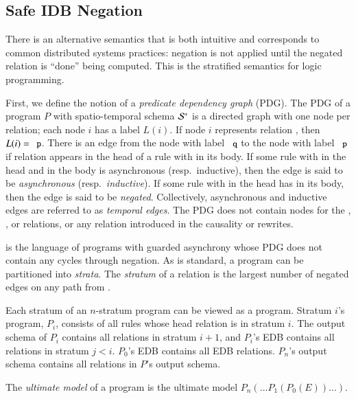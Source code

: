 \subsection{Safe IDB Negation}
\label{sec:perfect-construction}

There is an alternative semantics that is both intuitive and corresponds to common
distributed systems practices: negation is not applied until the negated
relation is ``done'' being computed.  This is the stratified semantics for logic programming.

First, we define the notion of a {\em predicate dependency graph} (PDG).  The PDG of a \lang program $P$ with spatio-temporal schema $\stschema$ is a directed graph with one node per relation; each node $i$ has a label $L(i)$.  If node $i$ represents relation , then $L(i) = \dedalus{p}$.  There is an edge from the node with label $\dedalus{q}$ to the node with label $\dedalus{p}$ if relation  appears in the head of a rule with  in its body.  If some rule with  in the head and  in the body is asynchronous (resp.\ inductive), then the edge is said to be {\em asynchronous} (resp.\ {\em inductive}).  If some rule with  in the head has  in its body, then the edge is said to be {\em negated}.  Collectively, asynchronous and inductive edges are referred to as {\em temporal edges}.  The PDG does not contain nodes for the , , or  relations, or any relation introduced in the causality or  rewrites.

\plang is the language of \lang programs with guarded asynchrony whose PDG does not contain any cycles through negation.  As is standard, a \plang program can be partitioned into {\em strata}.  The {\em stratum} of a relation  is the largest number of negated edges on any path from .

Each stratum of an $n$-stratum \plang program can be viewed as a \slang program.  Stratum $i$'s program, $P_i$, consists of all rules whose head relation is in stratum $i$.  The output schema of $P_i$ contains all relations in stratum $i+1$, and $P_i$'s EDB contains all relations in stratum $j < i$.  $P_0$'s EDB contains all EDB relations.  $P_n$'s output schema contains all relations in $P$'s output schema.

The {\em ultimate model} of a \slang program is the ultimate model $P_n(\ldots P_1(P_0(E)) \ldots )$.


